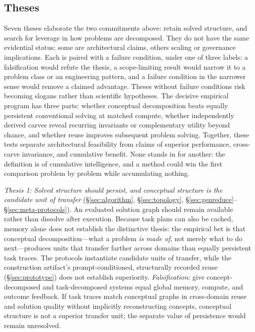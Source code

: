 \documentclass[11pt]{article}
\begin{document}
\subsection{Theses}
\label{sec:theses}

Seven theses elaborate the two commitments above: retain solved structure, and search for leverage in how problems are decomposed. They do not have the same evidential status; some are architectural claims, others scaling or governance implications. Each is paired with a failure condition, under one of three labels: a falsification would refute the thesis, a scope-limiting result would narrow it to a problem class or an engineering pattern, and a failure condition in the narrower sense would remove a claimed advantage. Theses without failure conditions risk becoming slogans rather than scientific hypotheses. The decisive empirical program has three parts: whether conceptual decomposition beats equally persistent conventional solving at matched compute, whether independently derived carves reveal recurring invariants or complementary utility beyond chance, and whether reuse improves subsequent problem solving. Together, these tests separate architectural feasibility from claims of superior performance, cross-carve invariance, and cumulative benefit. None stands in for another: the definition is of cumulative intelligence, and a method could win the first comparison problem by problem while accumulating nothing.

\emph{Thesis 1: Solved structure should persist, and conceptual structure is the candidate unit of transfer} (\S\ref{sec:algorithm}, \S\ref{sec:topology}, \S\ref{sec:genreduce}--\S\ref{sec:meta-protocols}). An evaluated solution graph should remain available rather than dissolve after execution. Because task plans can also be cached, memory alone does not establish the distinctive thesis: the empirical bet is that conceptual decomposition---what a problem \emph{is made of}, not merely what to do next---produces units that transfer farther across domains than equally persistent task traces. The protocols instantiate candidate units of transfer, while the construction artifact's prompt-conditioned, structurally recorded reuse (\S\ref{sec:prototype}) does not establish superiority. \emph{Falsification:} give concept-decomposed and task-decomposed systems equal global memory, compute, and outcome feedback. If task traces match conceptual graphs in cross-domain reuse and solution quality without implicitly reconstructing concepts, conceptual structure is not a superior transfer unit; the separate value of persistence would remain unresolved.
\end{document}
